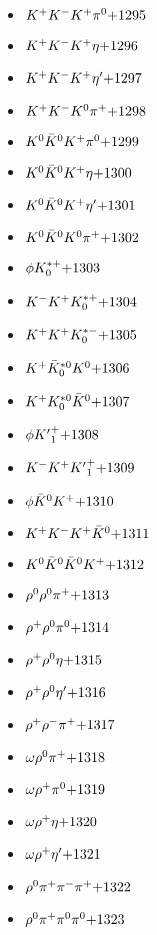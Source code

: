 \begin{multicols}{3}
\begin{itemize}
 \item $ K^{+} K^{-} K^{+} \pi^{0} \hfill{+1295}$
 \item $ K^{+} K^{-} K^{+} \eta \hfill{+1296}$
 \item $ K^{+} K^{-} K^{+} {\eta^{\prime}} \hfill{+1297}$
 \item $ K^{+} K^{-} K^{0} \pi^{+} \hfill{+1298}$
 \item $ K^{0} \bar{K}^{0} K^{+} \pi^{0} \hfill{+1299}$
 \item $ K^{0} \bar{K}^{0} K^{+} \eta \hfill{+1300}$
 \item $ K^{0} \bar{K}^{0} K^{+} {\eta^{\prime}} \hfill{+1301}$
 \item $ K^{0} \bar{K}^{0} K^{0} \pi^{+} \hfill{+1302}$
 \item $ \phi K_{0}^{*+} \hfill{+1303}$
 \item $ K^{-} K^{+} K_{0}^{*+} \hfill{+1304}$
 \item $ K^{+} K^{+} K_{0}^{*-} \hfill{+1305}$
 \item $ K^{+} \bar{K}_{0}^{*0} K^{0} \hfill{+1306}$
 \item $ K^{+} K_{0}^{*0} \bar{K}^{0} \hfill{+1307}$
 \item $ \phi {K^{\prime}}_{1}^{+} \hfill{+1308}$
 \item $ K^{-} K^{+} {K^{\prime}}_{1}^{+} \hfill{+1309}$
 \item $ \phi \bar{K}^{0} K^{+} \hfill{+1310}$
 \item $ K^{+} K^{-} K^{+} \bar{K}^{0} \hfill{+1311}$
 \item $ K^{0} \bar{K}^{0} \bar{K}^{0} K^{+} \hfill{+1312}$
 \item $ \rho^{0} \rho^{0} \pi^{+} \hfill{+1313}$
 \item $ \rho^{+} \rho^{0} \pi^{0} \hfill{+1314}$
 \item $ \rho^{+} \rho^{0} \eta \hfill{+1315}$
 \item $ \rho^{+} \rho^{0} {\eta^{\prime}} \hfill{+1316}$
 \item $ \rho^{+} \rho^{-} \pi^{+} \hfill{+1317}$
 \item $ \omega \rho^{0} \pi^{+} \hfill{+1318}$
 \item $ \omega \rho^{+} \pi^{0} \hfill{+1319}$
 \item $ \omega \rho^{+} \eta \hfill{+1320}$
 \item $ \omega \rho^{+} {\eta^{\prime}} \hfill{+1321}$
 \item $ \rho^{0} \pi^{+} \pi^{-} \pi^{+} \hfill{+1322}$
 \item $ \rho^{0} \pi^{+} \pi^{0} \pi^{0} \hfill{+1323}$

\end{itemize}
\end{multicols}
